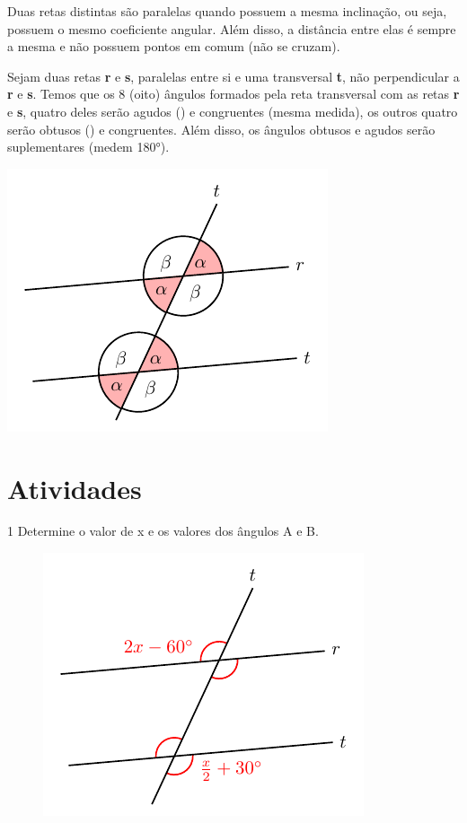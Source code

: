 {Duas retas distintas são paralelas quando possuem a mesma inclinação, ou
seja, possuem o mesmo coeficiente angular. Além disso, a distância entre
elas é sempre a mesma e não possuem pontos em comum (não se cruzam).

Sejam duas retas \textbf{r} e \textbf{s}, paralelas entre si e uma transversal 
\textbf{t}, não perpendicular a \textbf{r} e \textbf{s}. Temos que os 8 (oito)
ângulos formados pela reta transversal com as retas \textbf{r} e \textbf{s}, 
quatro deles serão agudos (\alpha) e congruentes (mesma medida), os outros quatro
serão obtusos (\beta) e congruentes. Além disso, os ângulos obtusos e agudos serão 
suplementares (medem 180°).

\includegraphics[width=.5\textwidth]{./tikz/023.pdf}
}

\pagebreak
\section*{Atividades}

\num{1} Determine o valor de x e os valores dos ângulos A e B.

\begin{figure}[htpb!]
\centering
\includegraphics[width=.6\textwidth]{./tikz/024.pdf}
\end{figure}


\begin{emptybox}
\end{emptybox}

